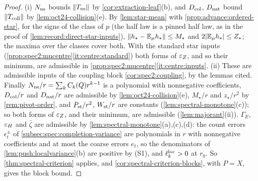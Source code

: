 \begin{proof}
(i) $N_{\rm ns}$ bounds $\left\|T_{\rm ns}\right\|$ by \cref{cor:extraction-leaf}(b), and
$D_{\rm col}$, $D_{\rm nat}$ bound $\left\|T_{\rm coll}\right\|$ by
\cref{lem:oct24-collision}(e). By \cref{lem:star-mean} with
\cref{prop:advance:ordered-star}, for the signs of the class of $p$ (the half law is
a pinned half law, as in the proof of \cref{lem:record:direct-star-inputs}),
$\left\|h_\star-\mathbb E_\mu h_\star\right\|\le M_\star$ and $2|\mathbb E_\mu h_\star|\le Z_\star$; the
maxima over the classes cover both. With the standard star inputs
(\cref{prop:spec2:mucentre}\ref{it:centre:standard}) both forms of $\varepsilon_Z$, and so
their minimum, are admissible in \cref{prop:spec2:mucentre}\ref{it:centre:inputs}.
(ii) These are admissible inputs of the coupling block \cref{cor:spec2:coupling}, by
the lemmas cited. Finally $N_{\rm ns}/r=\sum_kC_k(Q)r^{k-1}$ is a polynomial with
nonnegative coefficients, $D_{\rm col}/r$ and $D_{\rm nat}/r$ are admissible by
\cref{lem:oct24-collision}(e), $M_\star/r$ and $z_\star/r^2$ by \cref{rem:pivot-order},
and $P_{\rm st}/r^2$, $W_{\rm st}/r$ are constants (\cref{lem:spectral-monotone}(c)); so
both forms of $\varepsilon_Z$, and their minimum, are admissible (\cref{lem:majorant}(ii)).
$\Gamma_E$, $\varepsilon_H$ and $\bar\zeta$ are admissible by
\cref{lem:spectral-monotone}(a),(c),(d): the count errors $\epsilon^\pm_t$ of
\cref{subsec:spec:completion-variance} are polynomials in $r$ with nonnegative
coefficients and at most the coarse errors $e_t$, so the denominators of
\cref{lem:push:localvariance}(b) are positive by (S1), and $\ell^{\rm loc}_k>0$ at $r_0$.
So \cref{thm:spectral-criterion} applies, and
\cref{cor:spectral-criterion-blocks}, with $P=X$, gives the block bound.
\end{proof}

